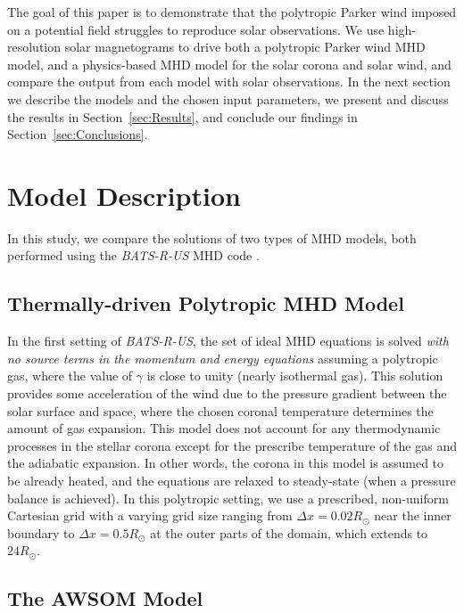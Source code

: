\documentclass[apj]{emulateapj}
\begin{document}
The goal of this paper is to demonstrate that the polytropic Parker wind imposed on a potential field struggles to reproduce solar observations. We use high-resolution solar magnetograms to drive both a polytropic Parker wind MHD model, and a physics-based MHD model for the solar corona and solar wind, and compare the output from each model with solar observations. In the next section we describe the models and the chosen input parameters, we present and discuss the results in Section~\ref{sec:Results}, and conclude our findings in Section~\ref{sec:Conclusions}.  

\section{Model Description}
\label{sec:Models}

In this study, we compare the solutions of two types of MHD models, both performed using the {\it BATS-R-US} MHD code \citep{powell99, Toth12}. 

\subsection{Thermally-driven Polytropic MHD Model}
\label{sec:ParkerModel}

In the first setting of {\it BATS-R-US}, the set of ideal MHD equations is solved {\it with no source terms in the momentum and energy equations} assuming a polytropic gas, where the value of $\gamma$ is close to unity (nearly isothermal gas). This solution provides some acceleration of the wind due to the pressure gradient between the solar surface and space, where the chosen coronal temperature determines the amount of gas expansion. This model does not account for any thermodynamic processes in the stellar corona except for the prescribe temperature of the gas and the adiabatic expansion. In other words, the corona in this model is assumed to be already heated, and the equations are relaxed to steady-state (when a pressure balance is achieved). In this polytropic setting, we use a prescribed, non-uniform Cartesian grid with a varying grid size ranging from $\Delta x = 0.02R_\odot$ near the inner boundary to $\Delta x=0.5R_\odot$ at the outer parts of the domain, which extends to $24R_\odot$.

\subsection{The AWSOM Model}
\label{sec:AWSOMModel}
\end{document}
